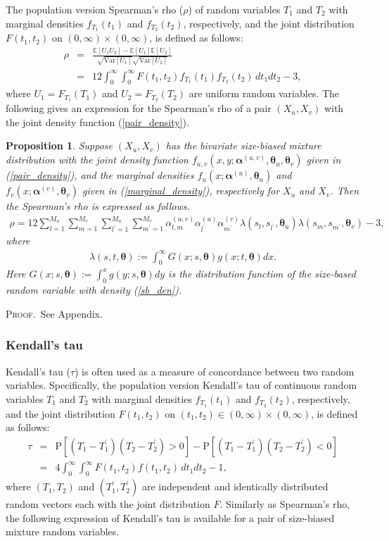\documentclass[11pt]{article}
\newtheorem{prop}{Proposition}
\def\a{\alpha} \def\b{\beta}
\def\bea{\begin{eqnarray*}} \def\eea{\end{eqnarray*}}
\def\beq{\begin{eqnarray}} \def\eeq{\end{eqnarray}}
\def\nn{\nonumber}
\def\proof{\textsc{Proof}.\ }
\def\mE{\mathbb{E}}
\def\mV{\text{Var}}
\def\mP{\text{P}}
\begin{document}
The population version Spearman's rho ($\rho$) of random variables $T_1$ and $T_2$ with marginal densities $f_{T_1}(t_1)$ and $f_{T_2}(t_2)$, respectively, and the joint distribution $F(t_1, t_2)$ on $(0, \infty)\times (0, \infty)$, is defined as follows:
\beq\label{def:rho}\nn
\rho &=& \frac{\mE[U_1 U_2] - \mE[U_1]\mE[U_2]}{\sqrt{\mV[U_1]}\sqrt{\mV[U_2]}}\\
&=& 12 \int_{0}^{\infty}\int_{0}^{\infty} F(t_1, t_2) f_{T_1}(t_1)f_{T_2}(t_2)\,dt_1 dt_2 -3,
\eeq
where $U_1 = F_{T_1}(T_1)$ and $U_2 = F_{T_2}(T_2)$ are uniform random variables. The following gives an expression for the Spearman's rho of a pair $(X_u, X_v)$ with the joint density function (\ref{pair_density}).
\begin{prop} Suppose $(X_u, X_v)$ has the bivariate size-biased mixture distribution with the joint density function $f_{u,v}(x, y; \bm{\a}^{(u,v)}, \bm{\theta}_u, \bm{\theta}_v)$ given in (\ref{pair_density}), and the marginal densities $f_u(x; \bm{\a}^{(u)}, \bm{\theta}_u)$ and $f_v(x; \bm{\a}^{(v)}, \bm{\theta}_v)$ given in (\ref{marginal_density}), respectively for $X_u$ and  $X_v$. Then the Spearman's rho is expressed as follows.
\beq\label{rho_exp}
\rho = 12\sum_{l = 1}^{M_u}\sum_{m = 1}^{M_v} \sum_{l^\prime = 1}^{M_u}\sum_{m^\prime = 1}^{M_v} \a^{(u,v)}_{l,m} \a^{(u)}_{l^\prime}\a^{(v)}_{m^\prime} \lambda(s_l, s_{l^\prime}, \bm{\theta}_u)\lambda(s_m, s_{m^\prime}, \bm{\theta}_v) -3, 
\eeq
where
\bea
\lambda(s, t, \bm{\theta}) := \int_0^{\infty} G(x;s, \bm{\theta})g(x; t, \bm{\theta})dx.
\eea
Here $G(x;s, \bm{\theta}) := \int_0^x g(y; s, \bm{\theta})dy$ is the distribution function of the size-based random variable with density (\ref{sb_den}).
\end{prop}

\proof See Appendix.

\subsubsection{Kendall's tau}

Kendall's tau ($\tau$) is often used as a measure of concordance between two random variables. Specifically, the population version Kendall's tau of continuous random variables $T_1$ and $T_2$ with marginal densities $f_{T_1}(t_1)$ and $f_{T_2}(t_2)$, respectively, and the joint distribution $F(t_1, t_2)$ on $(t_1, t_2) \in (0, \infty)\times (0, \infty)$, is defined as follows:
\beq\label{def:tau}\nn
\tau &=& \mP[(T_1-T_1^{\prime})(T_2 - T_2^{\prime}) > 0] - \mP[(T_1-T_1^{\prime})(T_2 - T_2^{\prime}) < 0]\\
&=& 4 \int_{0}^{\infty}\int_{0}^{\infty} F(t_1, t_2) f(t_1, t_2)\,dt_1 dt_2 - 1,
\eeq
where $(T_1, T_2)$ and  $(T_1^{\prime}, T_2^{\prime})$ are independent and identically distributed random vectors each with the joint distribution $F$. Similarly as Spearman's rho, the following expression of Kendall's tau is available for a pair of size-biased mixture random variables.
\end{document}
